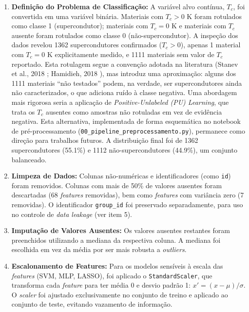 \documentclass[12pt, a4paper, oneside]{report}
\begin{document}
\begin{enumerate}
    \item \textbf{Definição do Problema de Classificação:} A variável alvo contínua, $T_c$, foi convertida em uma variável binária. Materiais com $T_c > 0$ K foram rotulados como classe 1 (supercondutor); materiais com $T_c = 0$ K e materiais com $T_c$ ausente foram rotulados como classe 0 (não-supercondutor). A inspeção dos dados revelou 1362 supercondutores confirmados ($T_c > 0$), apenas 1 material com $T_c = 0$ K explicitamente medido, e 1111 materiais sem valor de $T_c$ reportado. Esta rotulagem segue a convenção adotada na literatura (Stanev et al., 2018 \cite{stanev2018}; Hamidieh, 2018 \cite{hamidieh2018}), mas introduz uma aproximação: alguns dos 1111 materiais ``não testados'' podem, na verdade, ser supercondutores ainda não caracterizados, o que adiciona ruído à classe negativa. Uma abordagem mais rigorosa seria a aplicação de \textit{Positive-Unlabeled (PU) Learning}, que trata os $T_c$ ausentes como amostras não rotuladas em vez de evidência negativa. Esta alternativa, implementada de forma esquemática no notebook de pré-processamento (\texttt{00\_pipeline\_preprocessamento.py}), permanece como direção para trabalhos futuros. A distribuição final foi de 1362 supercondutores (55.1\%) e 1112 não-supercondutores (44.9\%), um conjunto balanceado.
    
    \item \textbf{Limpeza de Dados:} Colunas não-numéricas e identificadores (como \texttt{id}) foram removidos. Colunas com mais de 50\% de valores ausentes foram descartadas (68 \textit{features} removidas), bem como \textit{features} com variância zero (7 removidas). O identificador \texttt{group\_id} foi preservado separadamente, para uso no controle de \textit{data leakage} (ver item 5).
    
    \item \textbf{Imputação de Valores Ausentes:} Os valores ausentes restantes foram preenchidos utilizando a mediana da respectiva coluna. A mediana foi escolhida em vez da média por ser mais robusta a \textit{outliers}.
    
    \item \textbf{Escalonamento de Features:} Para os modelos sensíveis à escala das \textit{features} (SVM, MLP, LASSO), foi aplicado o \texttt{StandardScaler}, que transforma cada \textit{feature} para ter média 0 e desvio padrão 1: $x' = (x - \mu) / \sigma$. O \textit{scaler} foi ajustado exclusivamente no conjunto de treino e aplicado ao conjunto de teste, evitando vazamento de informação.


\end{enumerate}
\end{document}
